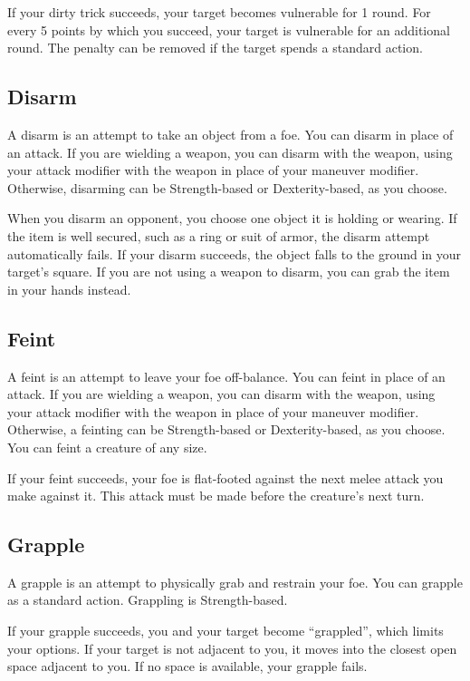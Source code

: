 If your dirty trick succeeds, your target becomes vulnerable for 1 round. \vulnerableexplanation For every 5 points by which you succeed, your target is vulnerable for an additional round. The penalty can be removed if the target spends a standard action.

\subsection{Disarm}\label{Disarm}
A disarm is an attempt to take an object from a foe. You can disarm in place of an attack. If you are wielding a weapon, you can disarm with the weapon, using your attack modifier with the weapon in place of your maneuver modifier. Otherwise, disarming can be Strength-based or Dexterity-based, as you choose.

When you disarm an opponent, you choose one object it is holding or wearing. If the item is well secured, such as a ring or suit of armor, the disarm attempt automatically fails. If your disarm succeeds, the object falls to the ground in your target's square. If you are not using a weapon to disarm, you can grab the item in your hands instead.

\subsection{Feint}\label{Feint}
A feint is an attempt to leave your foe off-balance. You can feint in place of an attack. If you are wielding a weapon, you can disarm with the weapon, using your attack modifier with the weapon in place of your maneuver modifier. Otherwise, a feinting can be Strength-based or Dexterity-based, as you choose. You can feint a creature of any size.

If your feint succeeds, your foe is flat-footed against the next melee attack you make against it. This attack must be made before the creature's next turn.

\subsection{Grapple}\label{Grapple}
A grapple is an attempt to physically grab and restrain your foe. You can grapple as a standard action. Grappling is Strength-based. 

If your grapple succeeds, you and your target become ``grappled'', which limits your options. If your target is not adjacent to you, it moves into the closest open space adjacent to you. If no space is available, your grapple fails.

